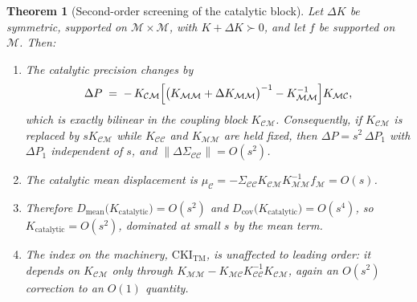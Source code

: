 \documentclass[11pt,reqno]{amsart}
\theoremstyle{plain}
\newtheorem{theorem}{Theorem}[section]
\theoremstyle{definition}
\theoremstyle{remark}
\numberwithin{equation}{section}
\newcommand{\CKI}{\mathrm{CKI}}
\newcommand{\Kcat}{K_{\mathrm{catalytic}}}
\newcommand{\CKItm}{\CKI_{\mathrm{TM}}}
\newcommand{\CC}{\mathcal{C}}
\newcommand{\MM}{\mathcal{M}}
\begin{document}
\begin{theorem}[Second-order screening of the catalytic block]
\label{thm:schur}
Let $\Delta K$ be symmetric, supported on $\MM\times\MM$, with $K+\Delta K\succ0$, and let $f$ be supported on $\MM$. Then:
\begin{enumerate}[label=\textup{(\roman*)},leftmargin=2.2em,itemsep=3pt]
\item The catalytic precision changes by
\begin{equation}
\label{eq:dP}
\Delta P \;=\; -\,K_{\CC\MM}\Bigl[\bigl(K_{\MM\MM}+\Delta K_{\MM\MM}\bigr)^{-1}-K_{\MM\MM}^{-1}\Bigr]K_{\MM\CC},
\end{equation}
which is exactly bilinear in the coupling block $K_{\CC\MM}$. Consequently, if $K_{\CC\MM}$ is replaced by $sK_{\CC\MM}$ while $K_{\CC\CC}$ and $K_{\MM\MM}$ are held fixed, then $\Delta P=s^2\,\Delta P_1$ with $\Delta P_1$ independent of $s$, and $\|\Delta\Sigma_{\CC\CC}\|=O(s^2)$.
\item The catalytic mean displacement is
$\mu_\CC=-\Sigma_{\CC\CC}K_{\CC\MM}K_{\MM\MM}^{-1}f_\MM=O(s)$.
\item Therefore $D_{\mathrm{mean}}\bigl(\Kcat\bigr)=O(s^2)$ and $D_{\mathrm{cov}}\bigl(\Kcat\bigr)=O(s^4)$, so
$\Kcat=O(s^2)$, dominated at small $s$ by the mean term.
\item The index on the machinery, $\CKItm$, is unaffected to leading order: it depends on $K_{\CC\MM}$ only through $K_{\MM\MM}-K_{\MM\CC}K_{\CC\CC}^{-1}K_{\CC\MM}$, again an $O(s^2)$ correction to an $O(1)$ quantity.
\end{enumerate}
\end{theorem}
\end{document}
